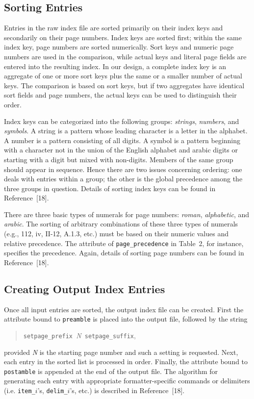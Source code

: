 \subsection{Sorting Entries}
Entries in the raw index file are sorted primarily on their index keys
and secondarily on their page numbers.
Index keys are sorted first; within the same index key,
page numbers are sorted numerically.
Sort keys and numeric page numbers are used in the comparison, while
actual keys and literal page fields are entered into the
resulting index.  In our design,
a complete index key is an aggregate of one or more sort keys plus the same
or a smaller number of actual keys.  The comparison is based on
sort keys, but if two aggregates have identical sort fields and
page numbers, the actual keys can be used to distinguish their order.

Index keys can be categorized into the following groups:
{\it strings\/}, {\it numbers\/}, and {\it symbols\/}.
A string is a pattern whose leading character is a letter in the alphabet.
A number is a pattern consisting of all digits.  A symbol is a pattern
beginning with a character not in the union of the English alphabet and
arabic digits or starting with a digit but mixed with non-digits.
Members of the same group should appear in sequence.
Hence there are two issues concerning ordering:
one deals with entries within a group; the other is
the global precedence among the three groups in question.
Details of sorting index keys can be found in Reference~[18].

There are three basic types of numerals for page numbers: {\it roman\/},
{\it alphabetic\/}, and {\it arabic\/}.
The sorting of arbitrary combinations of these three types of numerals
(e.g., 112, iv, II-12, A.1.3, etc.)
must be based on their numeric values and relative precedence.
The attribute of \verb|page_precedence| in Table~2, for instance, specifies
the precedence.  Again, details of sorting page numbers can be found in
Reference~[18].

\newpage
\subsection{Creating Output Index Entries}
Once all input entries are sorted, the output index file can be
created.  First the attribute bound to \verb|preamble| is placed into
the output file, followed by the string
\begin{quote}
  \verb|setpage_prefix |{\sl N\/}\verb| setpage_suffix|,
\end{quote}
provided {\sl N\/} is the starting page number and
such a setting is requested.  Next, each entry in the sorted list
is processed in order.  Finally, the attribute bound to \verb|postamble|
is appended at the end of the output file.
The algorithm for generating each entry with appropriate formatter-specific
commands or delimiters (i.e. \verb|item_|$i$'s, \verb|delim_|$i$'s, etc.)
is described in Reference~[18].

